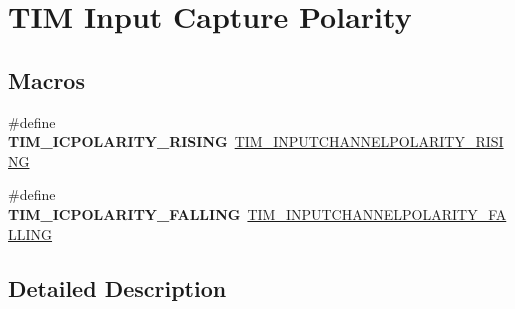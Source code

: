 \hypertarget{group___t_i_m___input___capture___polarity}{}\section{T\+IM Input Capture Polarity}
\label{group___t_i_m___input___capture___polarity}
\subsection*{Macros}
\begin{DoxyCompactItemize}
\item 
\mbox{\label{group___t_i_m___input___capture___polarity_gac79dd2a7ba97e5aac0bb9cbdc2d02ee1}} 
\#define {\bfseries T\+I\+M\+\_\+\+I\+C\+P\+O\+L\+A\+R\+I\+T\+Y\+\_\+\+R\+I\+S\+I\+NG}~\hyperlink{group___t_i_m___input___channel___polarity_ga4f4cede88a4ad4b33e81f2567e9bb08f}{T\+I\+M\+\_\+\+I\+N\+P\+U\+T\+C\+H\+A\+N\+N\+E\+L\+P\+O\+L\+A\+R\+I\+T\+Y\+\_\+\+R\+I\+S\+I\+NG}
\item 
\mbox{\label{group___t_i_m___input___capture___polarity_gaec0c00d0b749e8c18101cefcce7c32f6}} 
\#define {\bfseries T\+I\+M\+\_\+\+I\+C\+P\+O\+L\+A\+R\+I\+T\+Y\+\_\+\+F\+A\+L\+L\+I\+NG}~\hyperlink{group___t_i_m___input___channel___polarity_ga07441a8c0a52234e30f471c23803450c}{T\+I\+M\+\_\+\+I\+N\+P\+U\+T\+C\+H\+A\+N\+N\+E\+L\+P\+O\+L\+A\+R\+I\+T\+Y\+\_\+\+F\+A\+L\+L\+I\+NG}
\end{DoxyCompactItemize}


\subsection{Detailed Description}
